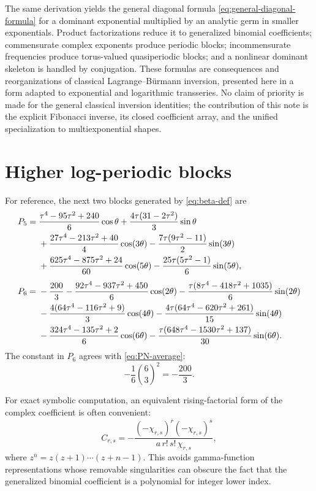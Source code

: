 \documentclass[11pt,oneside]{article}
\numberwithin{equation}{section}
\begin{document}
The same derivation yields the general diagonal formula
\cref{eq:general-diagonal-formula} for a dominant exponential multiplied by an
analytic germ in smaller exponentials.  Product factorizations reduce it to
generalized binomial coefficients; commensurate complex exponents produce
periodic blocks; incommensurate frequencies produce torus-valued quasiperiodic
blocks; and a nonlinear dominant skeleton is handled by conjugation.  These
formulas are consequences and reorganizations of classical
Lagrange--B\"urmann inversion, presented here in a form adapted to exponential
and logarithmic transseries.  No claim of priority is made for the general
classical inversion identities; the contribution of this note is the explicit
Fibonacci inverse, its closed coefficient array, and the unified specialization
to multiexponential shapes.

\appendix

\section{Higher log-periodic blocks}
\label{app:higher-blocks}

For reference, the next two blocks generated by \cref{eq:beta-def} are
\begin{align}
P_5={}&
 \frac{\tau^4-95\tau^2+240}{6}\cos\theta
 +\frac{4\tau(31-2\tau^2)}{3}\sin\theta
\notag\\
&+\frac{27\tau^4-213\tau^2+40}{4}\cos(3\theta)
 -\frac{7\tau(9\tau^2-11)}{2}\sin(3\theta)
\notag\\
&+\frac{625\tau^4-875\tau^2+24}{60}\cos(5\theta)
 -\frac{25\tau(5\tau^2-1)}{6}\sin(5\theta),
\label{eq:P5}\\[0.4em]
P_6={}&-\frac{200}{3}
 -\frac{92\tau^4-937\tau^2+450}{6}\cos(2\theta)
 -\frac{\tau(8\tau^4-418\tau^2+1035)}{6}\sin(2\theta)
\notag\\
&-\frac{4(64\tau^4-116\tau^2+9)}{3}\cos(4\theta)
 -\frac{4\tau(64\tau^4-620\tau^2+261)}{15}\sin(4\theta)
\notag\\
&-\frac{324\tau^4-135\tau^2+2}{6}\cos(6\theta)
 -\frac{\tau(648\tau^4-1530\tau^2+137)}{30}\sin(6\theta).
\label{eq:P6}
\end{align}
The constant in \(P_6\) agrees with
\cref{eq:PN-average}:
\begin{equation}
  -\frac16\binom63^2=-\frac{200}{3}.
\end{equation}

For exact symbolic computation, an equivalent rising-factorial form of the
complex coefficient is often convenient:
\begin{equation}
  C_{r,s}
  =-\frac{(-\chi_{r,s})^{\overline r}
           (-\chi_{r,s})^{\overline s}}
          {a\,r!\,s!\,\chi_{r,s}},
  \label{eq:C-rising-factorial}
\end{equation}
where \(z^{\overline n}=z(z+1)\cdots(z+n-1)\).  This avoids gamma-function
representations whose removable singularities can obscure the fact that the
generalized binomial coefficient is a polynomial for integer lower index.
\end{document}
